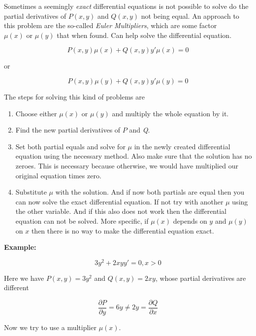 Sometimes a seemingly \emph{exact} differential equations is not possible to solve do the partial 
derivatives of \(P(x,y)\) and \(Q(x,y)\) not being equal. An approach to this problem are the so-called 
\emph{Euler Multipliers}, which are some factor \(\mu(x) \text{ or } \mu(y)\) that when found. Can 
help solve the differential equation.

\[
    P(x,y)\mu(x) + Q(x,y)y'\mu(x) = 0
\]

or 

\[
    P(x,y)\mu(y) + Q(x,y)y'\mu(y) = 0
\]

The steps for solving this kind of problems are

\begin{enumerate}
    
    \item Choose either \(\mu(x)\) or \(\mu(y)\) and multiply the whole equation by it.
    
    \item Find the new partial derivatives of \(P\) and \emph{Q}.
    
    \item Set both partial equals and solve for \(\mu\) in the newly created differential equation 
          using the necessary method. Also make sure that the solution has no zeroes. This is necessary 
          because otherwise, we would have multiplied our original equation times zero.
    
    \item Substitute \(\mu\) with the solution. And if now both partials are equal then you can now 
          solve the exact differential equation. If not try with another \(\mu\) using the other variable.
          And if this also does not work then the differential equation can not be solved. More specific, 
          if \(\mu(x)\) depends on \(y\) and \(\mu(y)\) on \(x\) then there is no way to make the 
          differential equation exact.

\end{enumerate}

\textbf{Example:}

\[
    3y^2 + 2xy y' = 0, x > 0 
\]

Here we have \(P(x,y) = 3y^2\) and \(Q(x,y) = 2xy\), whose partial derivatives are different

\[
    \frac{\partial P}{\partial y} = 6y \ne 2y = \frac{\partial Q}{\partial x}
\]

Now we try to use a multiplier \(\mu(x)\).

